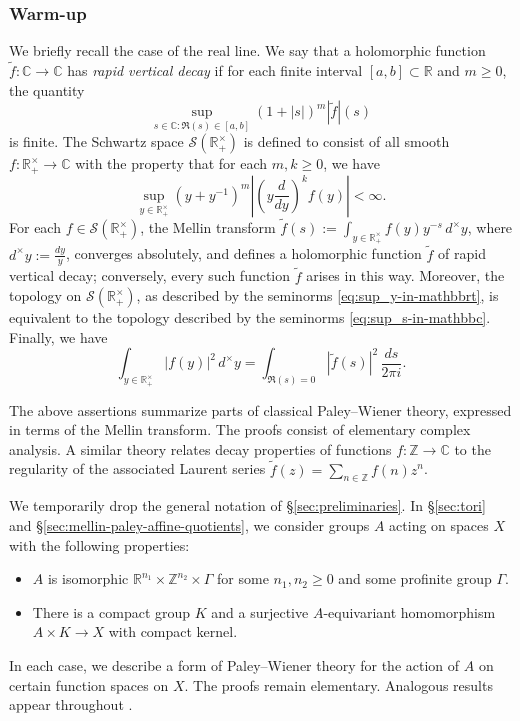 \documentclass[reqno]{amsart}
\theoremstyle{plain} \newtheorem{theorem} {Theorem}
\theoremstyle{definition} \newtheorem{definition} [theorem] {Definition}
\theoremstyle{itplain} %
\numberwithin{equation}{section}
\numberwithin{theorem}{section}
\renewcommand{\geq}{\geqslant}
\begin{document}
\subsubsection{Warm-up}
We briefly recall the case of the real line.  We say that a holomorphic function $\tilde{f} : \mathbb{C} \rightarrow \mathbb{C}$ has \emph{rapid vertical decay} if for each finite interval $[a,b] \subset \mathbb{R}$ and $m \geq 0$, the quantity
\begin{equation}\label{eq:sup_s-in-mathbbc}
  \sup_{s \in \mathbb{C} : \Re(s) \in [a,b]}
  (1 + |s|)^m |\tilde{f}|(s)
\end{equation}
is finite.  The Schwartz space $\mathcal{S}(\mathbb{R}^\times_+)$ is defined to consist of all smooth $f : \mathbb{R}^\times_+ \rightarrow \mathbb{C}$ with the property that for each $m, k \geq 0$, we have
\begin{equation}\label{eq:sup_y-in-mathbbrt}
  \sup_{y \in \mathbb{R}^\times_+} (y + y^{-1})^m \left\lvert \left( y \frac{d}{d y} \right)^k f(y) \right\rvert < \infty.
\end{equation}
For each $f \in \mathcal{S}(\mathbb{R}^\times_+)$, the Mellin transform $\tilde{f}(s) := \int _{y \in \mathbb{R}^\times_+} f(y) y^{-s} \, d^\times y$, where $d^\times y := \frac{d y}{y}$, converges absolutely, and defines a holomorphic function $\tilde{f}$ of rapid vertical decay; conversely, every such function $\tilde{f}$ arises in this way.  Moreover, the topology on $\mathcal{S}(\mathbb{R}^\times_+)$, as described by the seminorms \eqref{eq:sup_y-in-mathbbrt}, is equivalent to the topology described by the seminorms \eqref{eq:sup_s-in-mathbbc}.  Finally, we have
\begin{equation*}
  \int  _{y \in \mathbb{R}^\times_+} |f(y)|^2 \, d^\times y
  =
  \int _{\Re(s) = 0} \left\lvert \tilde{f}(s) \right\rvert^2 \, \frac{d s}{2 \pi i }.
\end{equation*}

The above assertions summarize parts of classical Paley--Wiener theory, expressed in terms of the Mellin transform.  The proofs consist of elementary complex analysis.  A similar theory relates decay properties of functions $f : \mathbb{Z} \rightarrow \mathbb{C}$ to the regularity of the associated Laurent series $\tilde{f}(z) = \sum_{n \in \mathbb{Z}} f(n) z^n$.

We temporarily drop the general notation of \S\ref{sec:preliminaries}.  In \S\ref{sec:tori} and \S\ref{sec:mellin-paley-affine-quotients}, we consider groups $A$ acting on spaces $X$ with the following properties:
\begin{itemize}
\item $A$ is isomorphic $\mathbb{R}^{n_1} \times \mathbb{Z}^{n_2} \times \Gamma$ for some $n_1, n_2 \geq 0$ and some profinite group $\Gamma$.
\item There is a compact group $K$ and a surjective $A$-equivariant homomorphism $A \times K \rightarrow X$ with compact kernel.
\end{itemize}
In each case, we describe a form of Paley--Wiener theory for the action of $A$ on certain function spaces on $X$.  The proofs remain elementary.  Analogous results appear throughout \cite[II.1]{MR1361168}.
\end{document}
